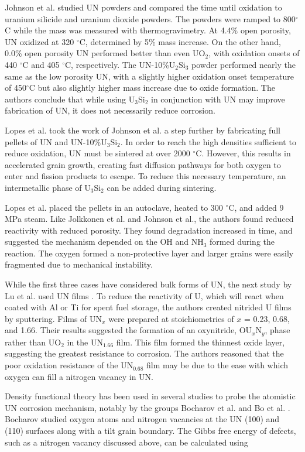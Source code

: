 \documentclass[3p,review,11pt]{elsarticle}
\begin{document}
Johnson et al. \cite{Johnson2016} studied UN powders and compared the time until oxidation to uranium silicide and uranium dioxide powders. The powders were ramped to 800$^{\circ}$C while the mass was measured with thermogravimetry. At 4.4\% open porosity, UN oxidized at 320 $^{\circ}$C, determined by 5\% mass increase. On the other hand, 0.0\% open porosity UN performed better than even UO$_{2}$, with oxidation onsets of 440 $^{\circ}$C and 405 $^{\circ}$C, respectively. The UN-10\%U$_{2}$Si$_{3}$ powder performed nearly the same as the low porosity UN, with a slightly higher oxidation onset temperature of 450$^{\circ}$C but also slightly higher mass increase due to oxide formation. The authors conclude that while using U$_{3}$Si$_{2}$ in conjunction with UN may improve fabrication of UN, it does not necessarily reduce corrosion.
\par 
Lopes et al. \cite{Lopes2017} took the work of Johnson et al. a step further by fabricating full pellets of UN and UN-10\%U$_{3}$Si$_{2}$. In order to reach the high densities sufficient to reduce oxidation, UN must be sintered at over 2000 $^{\circ}$C. However, this results in accelerated grain growth, creating fast diffusion pathways for both oxygen to enter and fission products to escape. To reduce this necessary temperature, an intermetallic phase of U$_{3}$Si$_{2}$ can be added during sintering.
\par 
Lopes et al. placed the pellets in an autoclave, heated to 300 $^{\circ}$C, and added 9 MPa steam. Like Jolkkonen et al. and Johnson et al., the authors found reduced reactivity with reduced porosity. They found degradation increased in time, and suggested the mechanism depended on the OH and NH$_{3}$ formed during the reaction. The oxygen formed a non-protective layer and larger grains were easily fragmented due to mechanical instability.

While the first three cases have considered bulk forms of UN, the next study by Lu et al. used UN films \cite{Lu2016}. To reduce the reactivity of U, which will react when coated with Al or Ti for spent fuel storage, the authors created nitrided U films by sputtering. Films of UN$_{x}$ were prepared at stoichiometries of $x$ = 0.23, 0.68, and 1.66. Their results suggested the formation of an oxynitride, OU$_{x}$N$_{y}$, phase rather than UO$_{2}$ in the UN$_{1.66}$ film. This film formed the thinnest oxide layer, suggesting the greatest resistance to corrosion. The authors reasoned that the poor oxidation resistance of the UN$_{0.68}$ film may be due to the ease with which oxygen can fill a nitrogen vacancy in UN.
\par 
Density functional theory has been used in several studies to probe the atomistic UN corrosion mechanism, notably by the groups Bocharov et al. \cite{Bocharov2013} and Bo et al. \cite{Bo2016}. Bocharov studied oxygen atoms and nitrogen vacancies at the UN (100) and (110) surfaces along with a tilt grain boundary. The Gibbs free energy of defects, such as a nitrogen vacancy discussed above, can be calculated using
\end{document}
